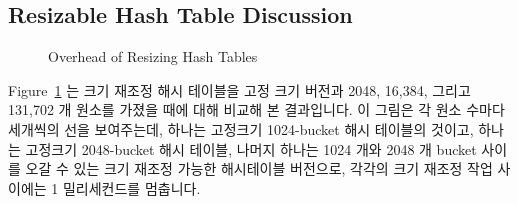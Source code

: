 \subsection{Resizable Hash Table Discussion}
\label{sec:datastruct:Resizable Hash Table Discussion}

\begin{figure}[tb]
\centering
{}
\caption{Overhead of Resizing Hash Tables}
\label{fig:datastruct:Overhead of Resizing Hash Tables}
\end{figure}

Figure~\ref{fig:datastruct:Overhead of Resizing Hash Tables}
는 크기 재조정 해시 테이블을 고정 크기 버전과 2048, 16,384, 그리고 131,702 개
원소를 가졌을 때에 대해 비교해 본 결과입니다.
이 그림은 각 원소 수마다 세개씩의 선을 보여주는데, 하나는 고정크기 1024-bucket
해시 테이블의 것이고, 하나는 고정크기 2048-bucket 해시 테이블, 나머지 하나는
1024 개와 2048 개 bucket 사이를 오갈 수 있는 크기 재조정 가능한 해시테이블
버전으로, 각각의 크기 재조정 작업 사이에는 1 밀리세컨드를 멈춥니다.

